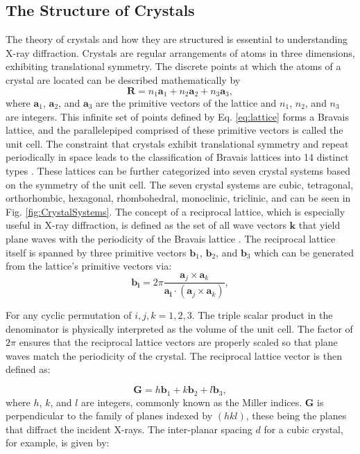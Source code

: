 \documentclass[aps,prb,twocolumn,superscriptaddress]{revtex4-2}
\begin{document}
\subsection{The Structure of Crystals}
The theory of crystals and how they are structured is essential to understanding
X-ray diffraction. Crystals are regular arrangements of atoms in three
dimensions, exhibiting translational symmetry. The discrete points at which the
atoms of a crystal are located can be described mathematically by 
\begin{equation}\label{eq:lattice}
    \mathbf{R} = n_1\mathbf{a}_1 + n_2\mathbf{a}_2 + n_3\mathbf{a}_3,   
\end{equation}
where $\mathbf{a}_1$, $\mathbf{a}_2$, and $\mathbf{a}_3$ are the primitive
vectors of the lattice and $n_1$, $n_2$, and $n_3$ are integers. This infinite
set of points defined by Eq. \ref{eq:lattice} forms a Bravais lattice, and the
parallelepiped comprised of these primitive vectors is called the unit cell. The
constraint that crystals exhibit translational symmetry and repeat periodically
in space leads to the classification of Bravais lattices into 14 distinct types
\cite{lattice_types}.  These lattices can be further categorized into seven
crystal systems based on the symmetry of the unit cell. The seven crystal
systems are cubic, tetragonal, orthorhombic, hexagonal, rhombohedral,
monoclinic, triclinic, and can be seen in Fig. \ref{fig:CrystalSystems}. The
concept of a reciprocal lattice, which is especially useful in X-ray
diffraction, is defined as the set of all wave vectors $\mathbf{k}$ that yield
plane waves with the periodicity of the Bravais lattice \cite{Ashcroft}.  The
reciprocal lattice itself is spanned by three primitive vectors $\mathbf{b}_1$,
$\mathbf{b}_2$, and $\mathbf{b}_3$ which can be generated from the lattice's
primitive vectors via:
\begin{equation}\label{eq:reciprocal}
    \mathbf{b_i} = 2\pi \frac{\mathbf{a}_j \times \mathbf{a}_k}
    {\mathbf{a_i} \cdot (\mathbf{a}_j \times \mathbf{a}_k)},
\end{equation}

For any cyclic permutation of ${i,j,k} = {1, 2, 3}$. The triple scalar product
in the denominator is physically interpreted as the volume of the unit cell. The
factor of $2\pi$ ensures that the reciprocal lattice vectors are properly scaled
so that plane waves match the periodicity of the crystal. The reciprocal lattice
vector is then defined as:

\begin{equation}\label{eq:reciprocal_vector}
    \mathbf{G} = h\mathbf{b}_1 + k\mathbf{b}_2 + l\mathbf{b}_3,
\end{equation}
where $h$, $k$, and $l$ are integers, commonly known as the Miller indices.
$\mathbf{G}$ is perpendicular to the family of planes indexed by $(hkl)$, these
being the planes that diffract the incident X-rays.  The inter-planar
spacing $d$ for a cubic crystal, for example,
is given by:
\end{document}
